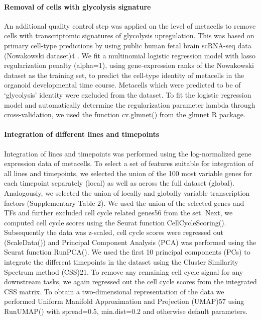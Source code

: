  
\paragraph{Removal of cells with glycolysis signature}
An additional quality control step was applied on the level of metacells to remove cells with transcriptomic signatures of glycolysis upregulation. This was based on primary cell-type predictions by using public human fetal brain scRNA-seq data (Nowakowski dataset)4 . We fit a multinomial logistic regression model with lasso regularization penalty (alpha=1), using gene-expression ranks of the Nowakowski dataset as the training set, to predict the cell-type identity of metacells in the organoid developmental time course. Metacells which were predicted to be of ‘glycolysis’ identity were excluded from the dataset. To fit the logistic regression model and automatically determine the regularization parameter lambda through cross-validation, we used the function cv.glmnet() from the glmnet R package.
 
 
\paragraph{Integration of different lines and timepoints}
Integration of lines and timepoints was performed using the log-normalized gene expression data of metacells. To select a set of features suitable for integration of all lines and timepoints, we selected the union of the 100 most variable genes for each timepoint separately (local) as well as across the full dataset (global). Analogously, we selected the union of locally and globally variable transcription factors (Supplementary Table 2). We used the union of the selected genes and TFs and further excluded cell cycle related genes56 from the set. Next, we computed cell cycle scores using the Seurat function CellCycleScoring(). Subsequently the data was z-scaled, cell cycle scores were regressed out (ScaleData()) and Principal Component Analysis (PCA) was performed using the Seurat function RunPCA(). We used the first 10 principal components (PCs) to integrate the different timepoints in the dataset using the Cluster Similarity Spectrum method (CSS)21. To remove any remaining cell cycle signal for any downstream tasks, we again regressed out the cell cycle scores from the integrated CSS matrix. To obtain a two-dimensional representation of the data we performed Uniform Manifold Approximation and Projection (UMAP)57 using RunUMAP() with spread=0.5, min.dist=0.2 and otherwise default parameters.
 
